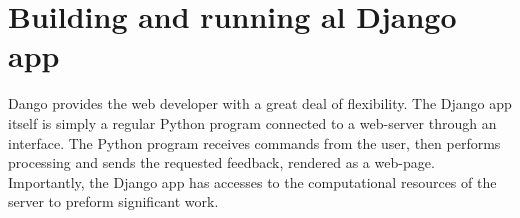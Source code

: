 \section{Building and running al Django app}

Dango provides the web developer with a great deal of flexibility.  The Django app itself is simply a regular Python program connected to a web-server through an interface.  The Python program receives commands from the user, then performs processing and sends the requested feedback, rendered as a web-page.  Importantly, the Django app has accesses to the computational resources of the server to preform significant work.



